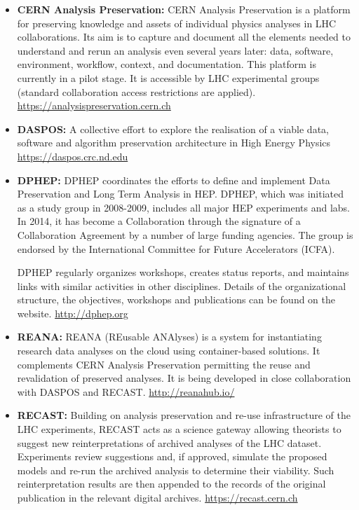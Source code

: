 \begin{itemize}
\item
  \textbf{CERN Analysis Preservation:} CERN Analysis Preservation is a
  platform for preserving knowledge and assets of individual physics
  analyses in LHC collaborations. Its aim is to capture and document all
  the elements needed to understand and rerun an analysis even several
  years later: data, software, environment, workflow, context, and
  documentation. This platform is currently in a pilot stage. It is
  accessible by LHC experimental groups (standard collaboration access
  restrictions are applied). \url{https://analysispreservation.cern.ch}
\item
  \textbf{DASPOS:} A collective effort to explore the realisation of a
  viable data, software and algorithm preservation architecture in High
  Energy Physics \url{https://daspos.crc.nd.edu}
\item
  \textbf{DPHEP:} DPHEP coordinates the efforts to define and implement
  Data Preservation and Long Term Analysis in HEP. DPHEP, which was
  initiated as a study group in 2008-2009, includes all major HEP
  experiments and labs. In 2014, it has become a Collaboration through
  the signature of a Collaboration Agreement by a number of large
  funding agencies. The group is endorsed by the International Committee
  for Future Accelerators (ICFA).

  DPHEP regularly organizes workshops, creates status reports, and
  maintains links with similar activities in other disciplines. Details
  of the organizational structure, the objectives, workshops and
  publications can be found on the website. \url{http://dphep.org}
\item
  \textbf{REANA:} REANA (REusable ANAlyses) is a system for
  instantiating research data analyses on the cloud using
  container-based solutions. It complements CERN Analysis Preservation
  permitting the reuse and revalidation of preserved analyses. It is
  being developed in close collaboration with DASPOS and RECAST.
  \url{http://reanahub.io/}
\item
  \textbf{RECAST:} Building on analysis preservation and re-use
  infrastructure of the LHC experiments, RECAST acts as a science
  gateway allowing theorists to suggest new reinterpretations of
  archived analyses of the LHC dataset. Experiments review suggestions
  and, if approved, simulate the proposed models and re-run the archived
  analysis to determine their viability. Such reinterpretation results
  are then appended to the records of the original publication in the
  relevant digital archives. \url{https://recast.cern.ch}
\end{itemize}

